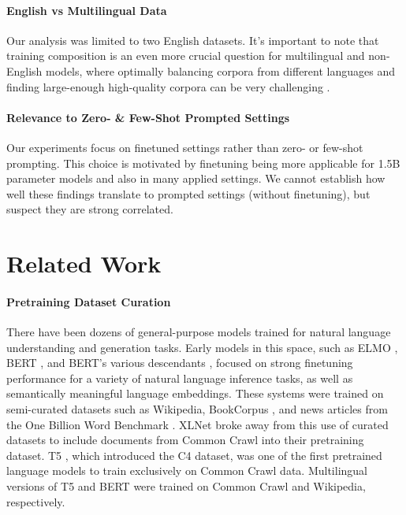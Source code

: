 \documentclass{article}
\begin{document}
\vspace{-3mm}
\paragraph{English vs Multilingual Data}
Our analysis was limited to two English datasets. 
It’s important to note that training composition is an even more crucial question for multilingual and non-English models, where optimally balancing corpora from different languages and finding large-enough high-quality corpora can be very challenging \citep{chung2023unimax}.

\vspace{-3mm}
\paragraph{Relevance to Zero- \& Few-Shot Prompted Settings} Our experiments focus on finetuned settings rather than zero- or few-shot prompting.
This choice is motivated by finetuning being more applicable for 1.5B parameter models and also in many applied settings.
We cannot establish how well these findings translate to prompted settings (without finetuning), but suspect they are strong correlated.

\vspace{-3mm}
\section{Related Work}
\label{sec:rw}


\vspace{-3mm}
\paragraph{Pretraining Dataset Curation}
There have been dozens of general-purpose models trained for natural language understanding and generation tasks.
Early models in this space, such as ELMO \citep{peters-etal-2018-deep}, BERT \citep{devlin-etal-2019-bert}, and BERT's various descendants \citep{liu2019roberta,lan2020albert}, focused on strong finetuning performance for a variety of natural language inference tasks, as well as semantically meaningful language embeddings.
These systems were trained on semi-curated datasets such as Wikipedia, BookCorpus \citep{zhu2015aligning}, and news articles from the One Billion Word Benchmark \citep{chelba2013one}.
XLNet \citep{yang2019xlnet} broke away from this use of curated datasets to include documents from Common Crawl into their pretraining dataset.
T5 \citep{raffel2020exploring}, which introduced the C4 dataset, was one of the first pretrained language models to train exclusively on Common Crawl data.
Multilingual versions of T5 \citep{xue2021mt5} and BERT were trained on Common Crawl and Wikipedia, respectively.
\end{document}
